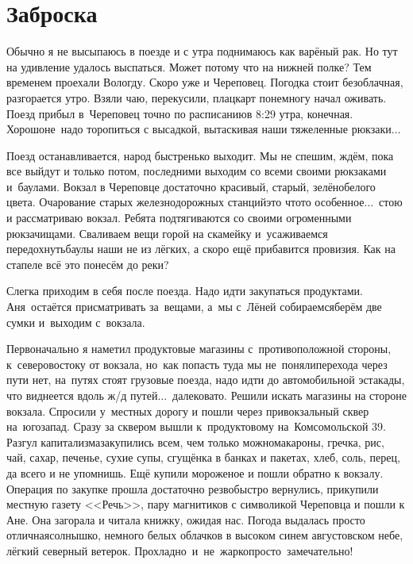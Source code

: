 \chapter{Заброска}
\vepsianrose

Обычно я не высыпаюсь в поезде и с утра поднимаюсь как варёный рак. Но тут на удивление удалось выспаться. Может потому что на нижней полке? Тем временем проехали Вологду. Скоро уже и Череповец. Погодка стоит безоблачная, разгорается утро. Взяли чаю, перекусили, плацкарт понемногу начал оживать. Поезд прибыл в~Череповец точно по расписанию\mdash в 8:29 утра, конечная. Хорошо\mdash не~надо торопиться с высадкой, вытаскивая наши тяжеленные рюкзаки$\ldots$
 
Поезд останавливается, народ быстренько выходит. Мы не спешим, ждём, пока все выйдут и только потом, последними выходим со всеми своими рюкзаками и~баулами. Вокзал в Череповце достаточно красивый, старый, зелёно\sdash белого цвета. Очарование старых железнодорожных станций\mdash это что\sdash то особенное$\ldots$~стою и рассматриваю вокзал. Ребята подтягиваются со своими огроменными рюкзачищами. Сваливаем вещи горой на скамейку и~усаживаемся передохнуть\mdash баулы наши не из лёгких, а скоро ещё прибавится провизия. Как на стапеле всё это понесём до реки? 

Слегка приходим в себя после поезда. Надо идти закупаться продуктами. Аня~остаётся присматривать за~вещами, а~мы с~Лёней собираемся\mdash берём две сумки и~выходим с~вокзала. 

Первоначально я наметил продуктовые магазины с~противоположной стороны, к~северо\sdash востоку от вокзала, но~как попасть туда мы не~поняли\mdash перехода через пути нет, на~путях стоят грузовые поезда, надо идти до автомобильной эстакады, что виднеется вдоль ж/д путей$\ldots$~далековато. Решили искать магазины на стороне вокзала. Спросили у~местных дорогу и пошли через привокзальный сквер на~юго\sdash запад. Сразу за сквером вышли к~продуктовому на~Комсомольской 39. Разгул капитализма\mdash закупились всем, чем только можно\mdash макароны, гречка, рис, чай, сахар, печенье, сухие супы, сгущёнка в банках и пакетах, хлеб, соль, перец, да всего и не упомнишь. Ещё купили мороженое и пошли обратно к вокзалу. Операция по закупке прошла достаточно резво\mdash быстро вернулись, прикупили местную газету <<Речь>>, пару магнитиков с символикой Череповца и пошли к Ане. Она загорала и читала книжку, ожидая нас. Погода выдалась просто отличная\mdash солнышко, немного белых облачков в высоком синем августовском небе, лёгкий северный ветерок. Прохладно~и~не~жарко\mdash просто~замечательно! 

